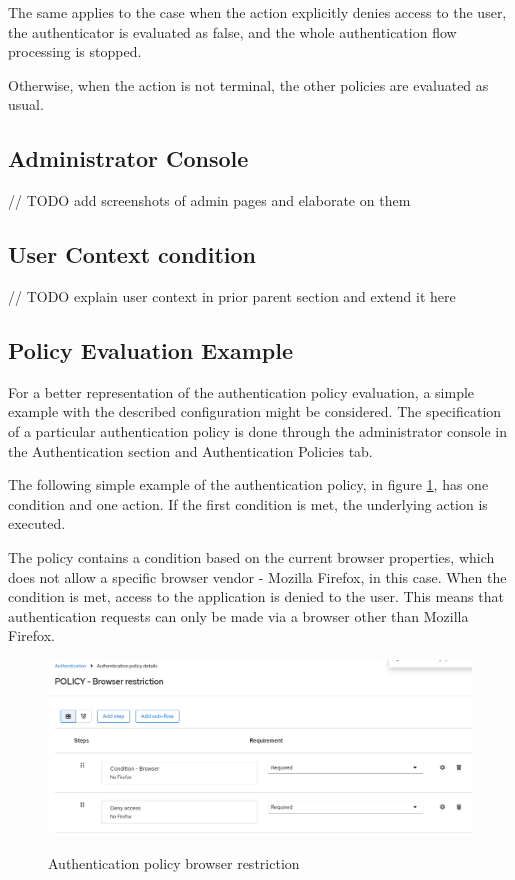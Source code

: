 The same applies to the case when the action explicitly denies access to the user, the authenticator is evaluated as false, and the whole authentication flow processing is stopped.

Otherwise, when the action is not terminal, the other policies are evaluated as usual.

\subsection{Administrator Console}
// TODO add screenshots of admin pages and elaborate on them

\subsection{User Context condition}
// TODO explain user context in prior parent section and extend it here

\subsection{Policy Evaluation Example}
For a better representation of the authentication policy evaluation, a simple example with the described configuration might be considered.
The specification of a particular authentication policy is done through the administrator console in the Authentication section and Authentication Policies tab.

The following simple example of the authentication policy, in figure \ref{fig:design-policy-browser-flow}, has one condition and one action.
If the first condition is met, the underlying action is executed.

The policy contains a condition based on the current browser properties, which does not allow a specific browser vendor - Mozilla Firefox, in this case.
When the condition is met, access to the application is denied to the user.
This means that authentication requests can only be made via a browser other than Mozilla Firefox.

\begin{figure}[htbp]
  \centering
  \includegraphics[width=1\textwidth]{img/sections/5-design/policy-browser-flow.png}
  \label{fig:design-policy-browser-flow}
  \caption{Authentication policy browser restriction}
\end{figure}

